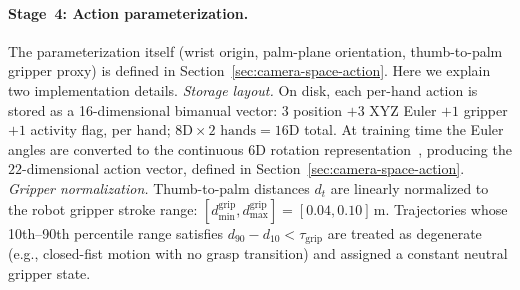 \documentclass{llmxive}
\begin{document}
\paragraph{Stage~4: Action parameterization.}
The parameterization itself (wrist origin, palm-plane orientation,
thumb-to-palm gripper proxy) is defined in
Section~\ref{sec:camera-space-action}. Here we explain two implementation
details. \emph{Storage layout.} On disk, each per-hand action is stored as
a 16-dimensional bimanual vector: $3$ position $+ 3$ XYZ Euler $+ 1$
gripper $+ 1$ activity flag, per hand; $8\text{D} \times 2\text{ hands} = 16\text{D}$ total. At training time the Euler angles
are converted to the continuous 6D rotation
representation~\cite{zhou2019continuity}, producing the $22$-dimensional
action vector, defined in Section~\ref{sec:camera-space-action}.
\emph{Gripper normalization.} Thumb-to-palm distances $d_t$ are linearly
normalized to the robot gripper stroke range: 
$[d_{\min}^{\mathrm{grip}}, d_{\max}^{\mathrm{grip}}]
= [0.04, 0.10]\,\mathrm{m}$. Trajectories whose 10th--90th percentile range
satisfies $d_{90} - d_{10} < \tau_{\mathrm{grip}}$ are treated as
degenerate (e.g., closed-fist motion with no grasp transition) and assigned
a constant neutral gripper state.

\end{document}
